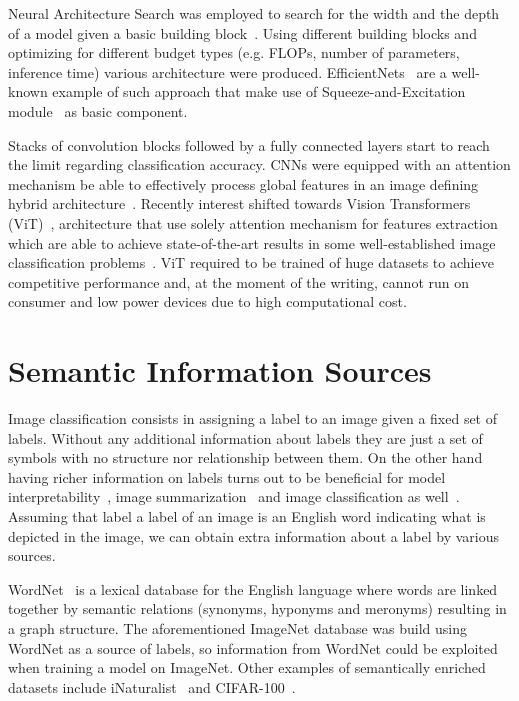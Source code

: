 Neural Architecture Search was employed to search for the width and the depth
of a model given a basic building block~\cite{ProgressiveNeuLiuC2017,
GeneticCnnXieL2017, LargeScaleEvoReal2017, RegularizedEvoReal2018}. Using
different building blocks and optimizing for different budget types (e.g.
FLOPs, number of parameters, inference time) various architecture were
produced. EfficientNets~\cite{EfficientnetRTanM2019, Efficientnetv2TanM2021}
are a well-known example of such approach that make use of
Squeeze-and-Excitation module~\cite{SqueezeAndExcHuJi2017} as basic component.

Stacks of convolution blocks followed by a fully connected layers start to
reach the limit regarding classification accuracy. CNNs were equipped with an
attention mechanism be able to effectively process global features in an image
defining hybrid architecture~\cite{SpatialTransfoJaderb2015,
LookAndThinkCaoC2015, ShowAttendAnXuKe2015, ScaCnnSpatiaChen2016}. Recently
interest shifted towards Vision Transformers
(ViT)~\cite{AnImageIsWorDosovi2020}, architecture that use solely attention
mechanism for features extraction which are able to achieve state-of-the-art
results in some well-established image classification
problems~\cite{TransformersInKhan2021, ASurveyOnVisHanK2023}. ViT required to
be trained of huge datasets to achieve competitive performance and, at the
moment of the writing, cannot run on consumer and low power devices due to high
computational cost.

\section{Semantic Information Sources}
\label{sec:semantic-information-sources}

Image classification consists in assigning a label to an image given a fixed
set of labels. Without any additional information about labels they are just a
set of symbols with no structure nor relationship between them. On the other
hand having richer information on labels turns out to be beneficial for model
interpretability~\cite{ImprovingInterDong2017}, image
summarization~\cite{SemanticImagePasini2022} and image classification as
well~\cite{MakingBetterMBertin2019}. Assuming that label a label of an image is
an English word indicating what is depicted in the image, we can obtain extra
information about a label by various sources.

WordNet~\cite{WordnetMi1995} is a lexical database for the English language
where words are linked together by semantic relations (synonyms, hyponyms and
meronyms) resulting in a graph structure. The aforementioned ImageNet database
was build using WordNet as a source of labels, so information from WordNet could
be exploited when training a model on ImageNet. Other examples of semantically
enriched datasets include iNaturalist~\cite{TheInaturalistHorn2017} and
CIFAR-100~\cite{LearningMultipKrizhe2009}.

